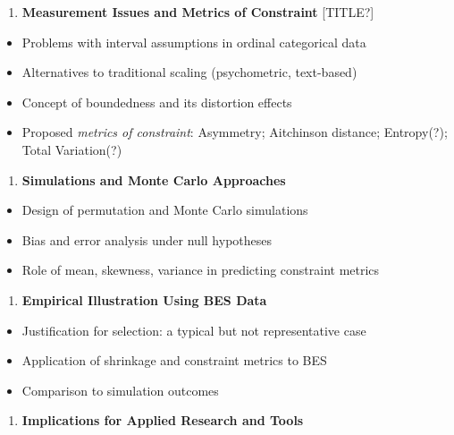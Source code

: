 \documentclass[
  12pt,
]{article}
\providecommand{\tightlist}{%
  \setlength{\itemsep}{0pt}\setlength{\parskip}{0pt}}
\theoremstyle{plain}
\theoremstyle{definition}
\theoremstyle{remark}
\begin{document}
\begin{enumerate}
\def\labelenumi{\arabic{enumi}.}
\setcounter{enumi}{2}
\tightlist
\item
  \textbf{Measurement Issues and Metrics of Constraint} {[}TITLE?{]}
\end{enumerate}

\begin{itemize}
\tightlist
\item
  Problems with interval assumptions in ordinal categorical data
\item
  Alternatives to traditional scaling (psychometric, text-based)
\item
  Concept of boundedness and its distortion effects
\item
  Proposed \emph{metrics of constraint}: Asymmetry; Aitchinson distance;
  Entropy(?); Total Variation(?)
\end{itemize}

\begin{enumerate}
\def\labelenumi{\arabic{enumi}.}
\setcounter{enumi}{3}
\tightlist
\item
  \textbf{Simulations and Monte Carlo Approaches}
\end{enumerate}

\begin{itemize}
\tightlist
\item
  Design of permutation and Monte Carlo simulations
\item
  Bias and error analysis under null hypotheses
\item
  Role of mean, skewness, variance in predicting constraint metrics
\end{itemize}

\begin{enumerate}
\def\labelenumi{\arabic{enumi}.}
\setcounter{enumi}{4}
\tightlist
\item
  \textbf{Empirical Illustration Using BES Data}
\end{enumerate}

\begin{itemize}
\tightlist
\item
  Justification for selection: a typical but not representative case
\item
  Application of shrinkage and constraint metrics to BES
\item
  Comparison to simulation outcomes
\end{itemize}

\begin{enumerate}
\def\labelenumi{\arabic{enumi}.}
\setcounter{enumi}{5}
\tightlist
\item
  \textbf{Implications for Applied Research and Tools}
\end{enumerate}
\end{document}
